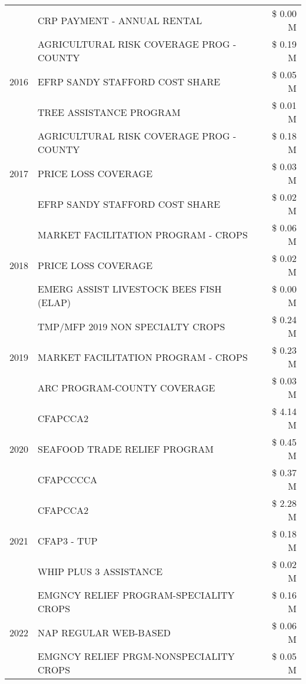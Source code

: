 \begin{tabular}{llr}
 & CRP PAYMENT - ANNUAL RENTAL & \$ 0.00 M \\
\cline{1-3}
\multirow[t]{3}{*}{2016} & AGRICULTURAL RISK COVERAGE PROG - COUNTY & \$ 0.19 M \\
 & EFRP SANDY STAFFORD COST SHARE & \$ 0.05 M \\
 & TREE ASSISTANCE PROGRAM & \$ 0.01 M \\
\cline{1-3}
\multirow[t]{3}{*}{2017} & AGRICULTURAL RISK COVERAGE PROG - COUNTY & \$ 0.18 M \\
 & PRICE LOSS COVERAGE & \$ 0.03 M \\
 & EFRP SANDY STAFFORD COST SHARE & \$ 0.02 M \\
\cline{1-3}
\multirow[t]{3}{*}{2018} & MARKET FACILITATION PROGRAM - CROPS & \$ 0.06 M \\
 & PRICE LOSS COVERAGE & \$ 0.02 M \\
 & EMERG ASSIST LIVESTOCK BEES FISH (ELAP) & \$ 0.00 M \\
\cline{1-3}
\multirow[t]{3}{*}{2019} & TMP/MFP 2019 NON SPECIALTY CROPS & \$ 0.24 M \\
 & MARKET FACILITATION PROGRAM - CROPS & \$ 0.23 M \\
 & ARC PROGRAM-COUNTY COVERAGE & \$ 0.03 M \\
\cline{1-3}
\multirow[t]{3}{*}{2020} & CFAPCCA2 & \$ 4.14 M \\
 & SEAFOOD TRADE RELIEF PROGRAM & \$ 0.45 M \\
 & CFAPCCCCA & \$ 0.37 M \\
\cline{1-3}
\multirow[t]{3}{*}{2021} & CFAPCCA2 & \$ 2.28 M \\
 & CFAP3 - TUP & \$ 0.18 M \\
 & WHIP PLUS 3 ASSISTANCE & \$ 0.02 M \\
\cline{1-3}
\multirow[t]{3}{*}{2022} & EMGNCY RELIEF PROGRAM-SPECIALITY CROPS & \$ 0.16 M \\
 & NAP REGULAR WEB-BASED & \$ 0.06 M \\
 & EMGNCY RELIEF PRGM-NONSPECIALITY CROPS & \$ 0.05 M \\
\cline{1-3}
\bottomrule
\end{tabular}
